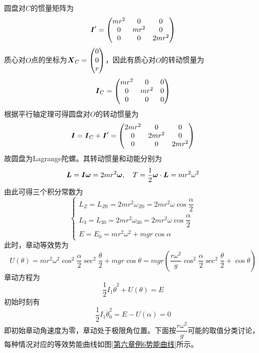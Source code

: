 \begin{solution}
圆盘对$C$的惯量矩阵为
\begin{equation*}
	\boldsymbol{I}' = \begin{pmatrix} mr^2 & 0 & 0 \\ 0 & mr^2 & 0 \\ 0 & 0 & 2mr^2 \end{pmatrix}
\end{equation*}
质心对$O$点的坐标为$\boldsymbol{X}_C = \begin{pmatrix} 0 \\ 0 \\ r \end{pmatrix}$，因此有质心对$O$的转动惯量为
\begin{equation*}
	\boldsymbol{I}_C = \begin{pmatrix} mr^2 & 0 & 0 \\ 0 & mr^2 & 0 \\ 0 & 0 & 0 \end{pmatrix}
\end{equation*}
根据平行轴定理可得圆盘对$O$的转动惯量为
\begin{equation*}
	\boldsymbol{I} = \boldsymbol{I}_C + \boldsymbol{I}' = \begin{pmatrix} 2mr^2 & 0 & 0 \\ 0 & 2mr^2 & 0 \\ 0 & 0 & 2mr^2 \end{pmatrix}
\end{equation*}
故圆盘为Lagrange陀螺。其转动惯量和动能分别为
\begin{equation*}
	\boldsymbol{L} = \boldsymbol{I} \boldsymbol{\omega} = 2mr^2 \boldsymbol{\omega},\quad T = \frac12 \boldsymbol{\omega}\cdot \boldsymbol{L} = mr^2 \omega^2
\end{equation*}
由此可得三个积分常数为
\begin{equation*}
	\begin{cases}
		L_Z = L_{Z0} = 2mr^2 \omega_{Z0} = 2mr^2 \omega \cos \dfrac{\alpha}{2} \\
		L_3 = L_{30} = 2mr^2 \omega_{30} = 2mr^2 \omega \cos \dfrac{\alpha}{2} \\
		E = E_0 = mr^2 \omega^2 + mgr\cos \alpha
	\end{cases}
\end{equation*}
此时，章动等效势为
\begin{equation*}
	U(\theta) = mr^2 \omega^2 \cos^2 \frac{\alpha}{2} \sec^2 \frac{\theta}{2} + mgr\cos \theta = mgr\left(\frac{r\omega^2}{g}\cos^2 \frac{\alpha}{2} \sec^2 \frac{\theta}{2} + \cos \theta\right)
\end{equation*}
章动方程为
\begin{equation*}
	\frac12 I_1 \dot{\theta}^2 + U(\theta) = E
\end{equation*}
初始时刻有
\begin{equation*}
	\frac12 I_1 \dot{\theta}_0^2 = E - U(\alpha) = 0
\end{equation*}
即初始章动角速度为零，章动处于极限角位置。下面按$\dfrac{r\omega^2}{g}$可能的取值分类讨论，每种情况对应的等效势能曲线如图\ref{第六章例6势能曲线}所示。


\end{solution}
